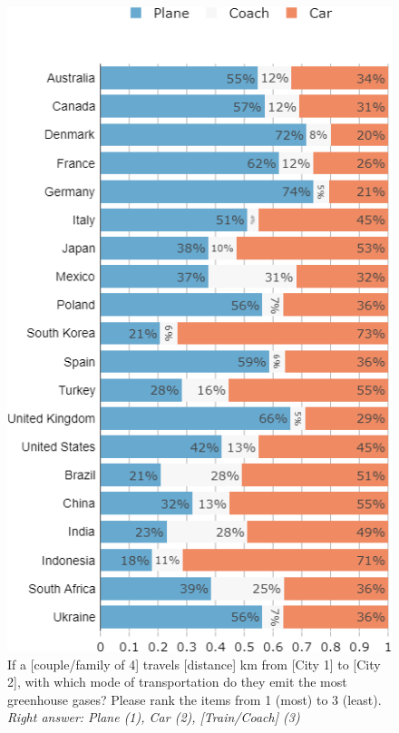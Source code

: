 \begin{frame}{}%
	\begin{figure}
	\caption{If a [couple/family of 4] travels [distance] km from [City 1] to [City 2], with which mode of transportation do they emit the most greenhouse gases? 
	Please rank the items from 1 (most) to 3 (least).
	\newline \footnotesize{\textit{Right answer: Plane (1), Car (2), [Train/Coach] (3)}}} %
	\vspace{-.3cm}
	\includegraphics[height=.8\paperheight]{../figures/country_comparison/footprint_transport_countries_most.png}
	\end{figure}
\end{frame}
	
